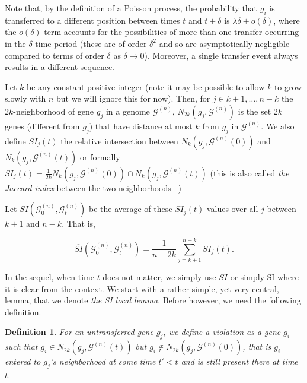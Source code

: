 \documentclass[runningheads, 11pt]{llncs}
\newtheorem{defn}[thm]{Definition}
\newcommand{\ignore}[1]{}
\newcommand{\G}{\mathcal{G}^{(n)}}
\begin{document}
Note that, by the definition of a Poisson process, the probability that $g_i$ is
transferred to a different position between times $t$ and $t+\delta$ is $\lambda
\delta + o(\delta)$, where the $o(\delta)$ term accounts for the possibilities
of more than one transfer occurring in the $\delta$ time period (these are of
order $\delta^2$ and so are asymptotically negligible compared to terms of order
$\delta$ as $\delta \rightarrow 0$). Moreover, a single transfer event always
results in a different sequence. 

Let $k$ be any constant positive integer (note it may be possible to allow $k$
to grow slowly with $n$ but we will ignore this for now). {Then, for $j \in k+1,
\ldots, n-k$ the $2k$-neighborhood of gene $g_j$ in a genome $\G$, $N_{2k}
(g_j,\G)$ is the set $2k$ genes (different from $g_j$) that have distance at
most $k$ from $g_j$ in $\G$. We also define $SI_j(t)$ the relative intersection
between $N_k (g_j,\G(0))$ and $N_k (g_j,\G(t))$ or formally $SI_j(t) =\frac1{2k}
N_k (g_j,\G(0)) \cap N_k (g_j,\G(t))$ (this is also called {\em the Jaccard
index} between the two neighborhoods~\cite{JACCARD_DISTANCE} )}

Let $\overline{SI}(\G_0, \G_t)$ be the average of these $SI_j(t)$ values over
all $j$ between $k+1$ and $n-k$. That is,

\begin{equation}
\label{sidef}
\overline{SI}(\G_0, \G_t)= \frac{1}{n-2k}\sum_{j=k+1}^{n-k} SI_j(t).
\end{equation}



In the sequel, when time $t$ does not matter, we simply use $\overline{SI}$ or
simply SI where it is clear from the context. We start with a rather simple,
yet very central, lemma, that we denote {\em the SI local lemma}. Before
however, we need the following definition.

\begin{defn} 
\label{def-viol}
For an untransferred gene $g_j$, we define a {\em violation} as a gene $g_i$
such that $g_i \in N_{2k} (g_j,\G(t))$ but $g_i \notin N_{2k} (g_j,\G(0))$, that
is $g_i$ entered to $g_j$'s neighborhood at some time $t'<t$ and is still
present there at time $t$.
\end{defn} 

\ignore
{
Before however, we need to define a special extreme condition, that is helpful
later.
}
\end{document}
